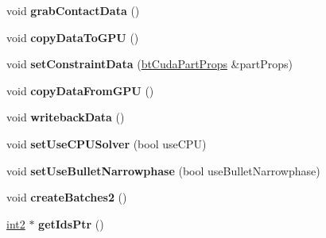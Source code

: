 \begin{DoxyCompactItemize}
\item 
\hypertarget{classbt_gpu_demo_dynamics_world_a96425f7ba667b32e43ba7521e10964e8}{void {\bfseries grab\+Contact\+Data} ()}\label{classbt_gpu_demo_dynamics_world_a96425f7ba667b32e43ba7521e10964e8}

\item 
\hypertarget{classbt_gpu_demo_dynamics_world_affbb79be4435f4ed93d1ad4a28788f34}{void {\bfseries copy\+Data\+To\+G\+P\+U} ()}\label{classbt_gpu_demo_dynamics_world_affbb79be4435f4ed93d1ad4a28788f34}

\item 
\hypertarget{classbt_gpu_demo_dynamics_world_aba4392964f60ed232f3e7b6ae0d28fb6}{void {\bfseries set\+Constraint\+Data} (\hyperlink{structbt_cuda_part_props}{bt\+Cuda\+Part\+Props} \&part\+Props)}\label{classbt_gpu_demo_dynamics_world_aba4392964f60ed232f3e7b6ae0d28fb6}

\item 
\hypertarget{classbt_gpu_demo_dynamics_world_a6b691613b937764a833a60d5ad97696e}{void {\bfseries copy\+Data\+From\+G\+P\+U} ()}\label{classbt_gpu_demo_dynamics_world_a6b691613b937764a833a60d5ad97696e}

\item 
\hypertarget{classbt_gpu_demo_dynamics_world_a670e36070f1b0a184f53f63a738f959b}{void {\bfseries writeback\+Data} ()}\label{classbt_gpu_demo_dynamics_world_a670e36070f1b0a184f53f63a738f959b}

\item 
\hypertarget{classbt_gpu_demo_dynamics_world_a415ffe731a2d43fca31280ae4475a793}{void {\bfseries set\+Use\+C\+P\+U\+Solver} (bool use\+C\+P\+U)}\label{classbt_gpu_demo_dynamics_world_a415ffe731a2d43fca31280ae4475a793}

\item 
\hypertarget{classbt_gpu_demo_dynamics_world_a46b0cfec91354cfafbb122ae71677a99}{void {\bfseries set\+Use\+Bullet\+Narrowphase} (bool use\+Bullet\+Narrowphase)}\label{classbt_gpu_demo_dynamics_world_a46b0cfec91354cfafbb122ae71677a99}

\item 
\hypertarget{classbt_gpu_demo_dynamics_world_af18bd2f34e239e7a1df8b969aae09f31}{void {\bfseries create\+Batches2} ()}\label{classbt_gpu_demo_dynamics_world_af18bd2f34e239e7a1df8b969aae09f31}

\item 
\hypertarget{classbt_gpu_demo_dynamics_world_aded9e07c289411c8ad84375b378bc81b}{\hyperlink{structint2}{int2} $\ast$ {\bfseries get\+Ids\+Ptr} ()}\label{classbt_gpu_demo_dynamics_world_aded9e07c289411c8ad84375b378bc81b}


\end{DoxyCompactItemize}
